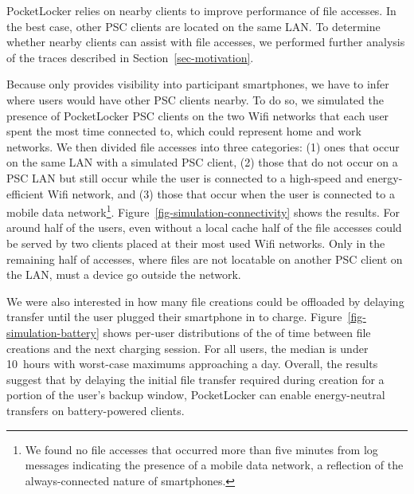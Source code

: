 PocketLocker relies on nearby clients to improve performance of file accesses.
In the best case, other PSC clients are located on the same LAN. To determine
whether nearby clients can assist with file accesses, we performed further
analysis of the traces described in Section~\ref{sec-motivation}.

Because \PhoneLab{} only provides visibility into participant smartphones, we
have to infer where users would have other PSC clients nearby. To do so, we
simulated the presence of PocketLocker PSC clients on the two Wifi networks
that each user spent the most time connected to, which could represent home
and work networks. We then divided file accesses into three categories: (1)
ones that occur on the same LAN with a simulated PSC client, (2) those that
do not occur on a PSC LAN but still occur while the user is connected to a
high-speed and energy-efficient Wifi network, and (3) those that occur when
the user is connected to a mobile data network\footnote{We found no file
  accesses that occurred more than five minutes from log messages indicating
  the presence of a mobile data network, a reflection of the always-connected
nature of smartphones.}. Figure~\ref{fig-simulation-connectivity} shows the
results. For around half of the users, even without a local cache half of the
file accesses could be served by two clients placed at their most used Wifi
networks. Only in the remaining half of accesses, where files are not locatable
on another PSC client on the LAN, must a device go outside the network.

We were also interested in how many file creations could be offloaded by delaying
transfer until the user plugged their smartphone
in to charge. Figure~\ref{fig-simulation-battery} shows per-user
distributions of the of time between file creations and the next charging
session. For all users, the median is under 10~hours with worst-case maximums
approaching a day. Overall, the results suggest that by delaying the initial
file transfer required during creation for a portion of the user's backup
window, PocketLocker can enable energy-neutral transfers
on battery-powered clients.


